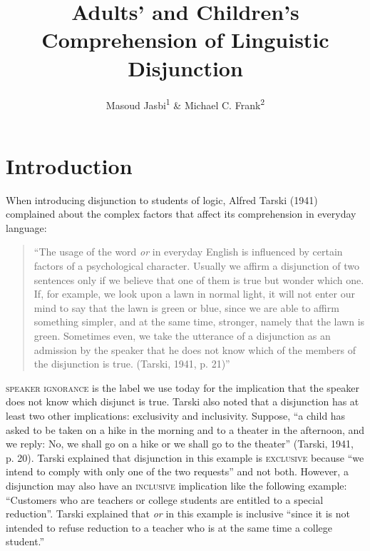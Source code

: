 \documentclass[
  english,
  ,man,floatsintext]{apa6}
\title{Adults' and Children's Comprehension of Linguistic Disjunction}
\author{Masoud Jasbi\textsuperscript{1} \& Michael C. Frank\textsuperscript{2}}
\date{}
\affiliation{\vspace{0.5cm}\textsuperscript{1} University of California, Davis\\\textsuperscript{2} Stanford University}
\begin{document}
\maketitle

\hypertarget{introduction}{%
\section{Introduction}\label{introduction}}

When introducing disjunction to students of logic, Alfred Tarski (1941) complained about the complex factors that affect its comprehension in everyday language:

\begin{quote}
\enquote{The usage of the word \emph{or} in everyday English is influenced by certain factors of a psychological character. Usually we affirm a disjunction of two sentences only if we believe that one of them is true but wonder which one. If, for example, we look upon a lawn in normal light, it will not enter our mind to say that the lawn is green or blue, since we are able to affirm something simpler, and at the same time, stronger, namely that the lawn is green. Sometimes even, we take the utterance of a disjunction as an admission by the speaker that he does not know which of the members of the disjunction is true. (Tarski, 1941, p. 21)}
\end{quote}

\textsc{speaker ignorance} is the label we use today for the implication that the speaker does not know which disjunct is true. Tarski also noted that a disjunction has at least two other implications: exclusivity and inclusivity. Suppose, \enquote{a child has asked to be taken on a hike in the morning and to a theater in the afternoon, and we reply: No, we shall go on a hike or we shall go to the theater} (Tarski, 1941, p. 20). Tarski explained that disjunction in this example is \textsc{exclusive} because \enquote{we intend to comply with only one of the two requests} and not both. However, a disjunction may also have an \textsc{inclusive} implication like the following example: \enquote{Customers who are teachers or college students are entitled to a special reduction}. Tarski explained that \emph{or} in this example is inclusive \enquote{since it is not intended to refuse reduction to a teacher who is at the same time a college student.}
\end{document}
